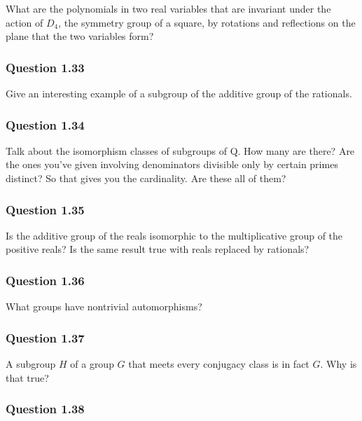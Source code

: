 What are the polynomials in two real variables that are invariant under
the action of \(D_4\), the symmetry group of a square, by rotations and
reflections on the plane that the two variables form?

\hypertarget{question-1.33}{%
\subsubsection{Question 1.33}\label{question-1.33}}

Give an interesting example of a subgroup of the additive group of the
rationals.

\hypertarget{question-1.34}{%
\subsubsection{Question 1.34}\label{question-1.34}}

Talk about the isomorphism classes of subgroups of Q. How many are
there? Are the ones you've given involving denominators divisible only
by certain primes distinct? So that gives you the cardinality. Are these
all of them?

\hypertarget{question-1.35}{%
\subsubsection{Question 1.35}\label{question-1.35}}

Is the additive group of the reals isomorphic to the multiplicative
group of the positive reals? Is the same result true with reals replaced
by rationals?

\hypertarget{question-1.36}{%
\subsubsection{Question 1.36}\label{question-1.36}}

What groups have nontrivial automorphisms?

\hypertarget{question-1.37}{%
\subsubsection{Question 1.37}\label{question-1.37}}

A subgroup \(H\) of a group \(G\) that meets every conjugacy class is in
fact \(G\). Why is that true?

\hypertarget{question-1.38}{%
\subsubsection{Question 1.38}\label{question-1.38}}

